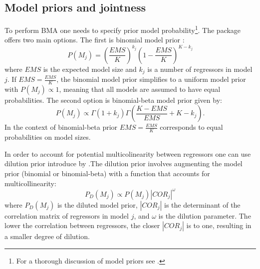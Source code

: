 \documentclass[a4paper]{article}
\begin{document}
\subsection{Model priors and jointness}\label{prior_joint}
\noindent To perform BMA one needs to specify prior model probability\footnote{For a thorough discussion of model priors see \citet{Sala+2004,Ley+2009,George+2010,Eicher+2011}.}. The package offers two main options. The first is binomial model prior \citep{Sala+2004}:
\begin{equation}
    P(M_{j})=(\frac{EMS}{K})^{k_{j}}(1-\frac{EMS}{K})^{K-k_{j}}
\end{equation}
where $EMS$ is the expected model size and $k_{j}$ is a number of regressors in model $j$. If $EMS = \frac{EMS}{K}$, the binomial model prior simplifies to a uniform model prior with $P(M_{j}) \propto 1$, meaning that all models are assumed to have equal probabilities. The second option is binomial-beta model prior \citet{Ley+2009} given by:
\begin{equation}
    P(M_{j}) \propto \Gamma(1+k_{j})\Gamma(\frac{K-EMS}{EMS}+K-k_{j}).
\end{equation}
In the context of binomial-beta prior $EMS = \frac{EMS}{K}$ corresponds to equal probabilities on model sizes.

\indent In order to account for potential multicolinearity between regressors one can use dilution prior introduce by \citet{George+2010}.The dilution prior involves augmenting the model prior (binomial or binomial-beta) with a function that accounts for multicollinearity:
\begin{equation}
    P_{D}(M_{j}) \propto P(M_{j})|COR_{j}|^{\omega}
\end{equation}
where $P_{D}(M_{j})$ is the diluted model prior, $|COR_{j}|$ is the determinant of the correlation matrix of regressors in model $j$, and $\omega$ is the dilution parameter. The lower the correlation between regressors, the closer $|COR_{j}|$ is to one, resulting in a smaller degree of dilution.
\end{document}
